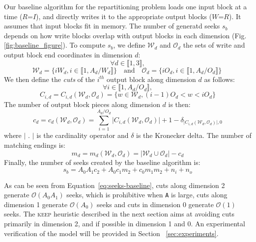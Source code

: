 \documentclass[sigconf, nonacm]{acmart}
\newcommand{\keep}[0]{\textsc{keep}\xspace}
\begin{document}
Our baseline algorithm for the repartitioning problem loads one input block
at a time ($R$=$I$), and directly writes it to the appropriate output
blocks ($W$=$R$). It assumes that input blocks fit in memory. The number of
generatd seeks $s_b$
depends on how write blocks overlap with
output blocks in each dimension (Fig.\ref{fig:baseline_figure}). To compute $s_b$, we define
$\mathcal{W}_d$ and $\mathcal{O}_d$ the sets of write and output block end
coordinates in dimension $d$:
\[
  \forall d \in \llbracket 1, 3 \rrbracket,
\]
\begin{equation}
  \mathcal{W}_d = \Big\{ iW_d, i \in \llbracket 1, A_d/W_d \rrbracket \Big\} \quad \mathrm{and} \quad
  \mathcal{O}_d = \Big\{ iO_d, i \in \llbracket 1, A_d/O_d \rrbracket \Big\} ~\label{eq:baseline-blocks}
\end{equation}
We then define the \emph{cuts} of the $i^{th}$ output block along dimension
$d$ as follows:
\[
  \forall i \in \llbracket 1, A_d/O_d \rrbracket,
\]
\[
  C_{i, d} = C_{i, d}\left(  \mathcal{W}_d, \mathcal{O}_d \right) = \Big\{ w \in \mathcal{W}_d, (i-1)O_d < w < iO_d \Big\}
\]
The number of output block pieces along dimension $d$ is then:
\[
  c_d = c_d\left(  \mathcal{W}_d, \mathcal{O}_d \right) =
               \sum_{i=1}^{A_d/O_d} \vert C_{i, d}\left(  \mathcal{W}_d, \mathcal{O}_d \right) \vert + 1 - \delta_{\vert C_{i, d}\left(  \mathcal{W}_d, \mathcal{O}_d \right) \vert, 0}
\]
where $\vert$ . $\vert$ is the cardinality operator and $\delta$ is the Kronecker delta.
The number of matching endings is:
\[
  m_d = m_d\left(  \mathcal{W}_d, \mathcal{O}_d \right) = \vert \mathcal{W}_d \cup  \mathcal{O}_d \vert  - c_d
  \]
Finally, the number of seeks created by the baseline algorithm is:
\begin{equation}
  s_b = A_0 A_1 c_2 +
      A_0 c_1 m_2 +
      c_0 m_1 m_2
       + n_i + n_o \label{eq:seeks-baseline}
\end{equation}


As can be seen from Equation~\ref{eq:seeks-baseline}, cuts along dimension 2 generate $\mathcal{O}(A_0 A_1)$
seeks, which is prohibitive when \texttt{A} is large, cuts along dimension 1 generate $\mathcal{O}(A_0)$ seeks and cuts in
dimension 0 generate $\mathcal{O}(1)$ seeks. The \keep heuristic described
in the next section aims at avoiding cuts primarily in dimension 2, and if
possible in dimension 1 and 0. An experimental verification of the model will be provided in
Section ~\ref{sec:experiments}.




\end{document}
